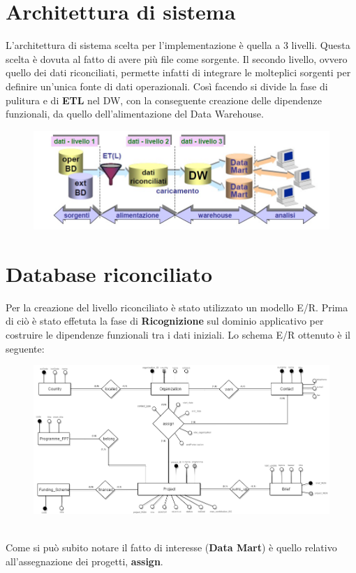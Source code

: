 \documentclass[12pt,a4paper]{report}
\begin{document}
\section*{Architettura di sistema}
L'architettura di sistema scelta per l'implementazione è quella a 3 livelli. Questa scelta è dovuta al fatto di avere più file come sorgente. Il secondo livello, ovvero quello dei dati riconciliati, permette infatti di integrare le molteplici sorgenti per definire un'unica fonte di dati operazionali. Così facendo si divide la fase di pulitura e di \textbf{ETL} nel DW, con la conseguente creazione delle dipendenze funzionali, da quello dell'alimentazione del Data Warehouse.
\begin{figure}[htbp]
	\centering
	\includegraphics[scale=0.6]{architettura}
\end{figure}
\section*{Database riconciliato}
Per la creazione del livello riconciliato è stato utilizzato un modello E/R. Prima di ciò è stato effetuta la fase di \textbf{Ricognizione} sul dominio applicativo per costruire le dipendenze funzionali tra i dati iniziali. Lo schema E/R ottenuto è il seguente:\\
\begin{figure}[htbp]
	\centering
	\includegraphics[scale=0.50]{reconciled}
\end{figure}
\\Come si può subito notare il fatto di interesse (\textbf{Data Mart}) è quello relativo all'assegnazione dei progetti, \textbf{assign}.
\end{document}
